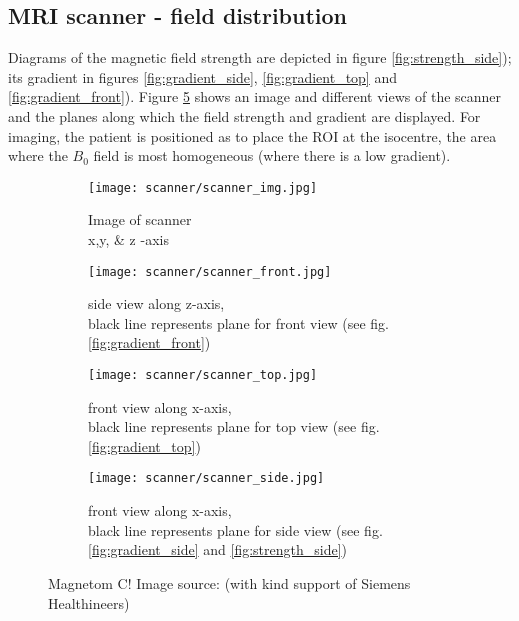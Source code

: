 \subsection{MRI scanner - field distribution}
\label{sec:magnetom}

Diagrams of the magnetic field strength are depicted in figure \ref{fig:strength_side}); its gradient in figures \ref{fig:gradient_side}, \ref{fig:gradient_top} and \ref{fig:gradient_front}).
Figure \ref{fig:scanner} shows an image and different views of the scanner and the planes along which the field strength and gradient are displayed.
For imaging, the patient is positioned as to place the ROI at the isocentre, the area where the $B_0$ field is most homogeneous (where there is a low gradient).

\begin{figure}[!htb]
\centering
  \begin{subfigure}[b]{0.4\textwidth}
	\centering
	\texttt{[image: scanner/scanner\_img.jpg]}
	\caption{Image of scanner\\ x,y, \& z -axis}
	\label{fig:scanner_image}
  \end{subfigure}
    \hfill
  \begin{subfigure}[b]{0.4\textwidth}
  	\centering
    \texttt{[image: scanner/scanner\_front.jpg]}
    \caption{side view along z-axis,\\ black line represents plane for front view (see fig. \ref{fig:gradient_front})}
    \label{fig:scanner_front}
  \end{subfigure}
  
  \begin{subfigure}[b]{0.4\textwidth}
   	\centering
   	\texttt{[image: scanner/scanner\_top.jpg]}
   	\caption{front view along x-axis,\\ black line represents plane for top view (see fig. \ref{fig:gradient_top})}
   	\label{fig:scanner_top}
  \end{subfigure}
    \hfill
  \begin{subfigure}[b]{0.4\textwidth}
  	\centering
  	\texttt{[image: scanner/scanner\_side.jpg]}
  	\caption{front view along x-axis,\\ black line represents plane for side view (see fig. \ref{fig:gradient_side} and \ref{fig:strength_side})}
  	\label{fig:scanner_side}
  \end{subfigure}
  \caption[Magnetom C! Image source: \cite{magnetom_handbook}]{Magnetom C! Image source: \cite{magnetom_handbook} (with kind support of Siemens Healthineers)}
  \label{fig:scanner}
\end{figure}

